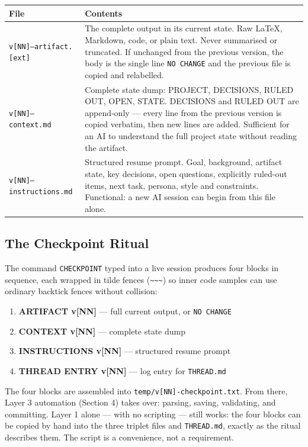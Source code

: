 \documentclass[12pt,letterpaper]{article}
\begin{document}
\begin{center}
\begin{tabular}{@{}lp{10cm}@{}}
\toprule
\textbf{File} & \textbf{Contents} \\
\midrule
\texttt{v[NN]--artifact.[ext]} &
The complete output in its current state. Raw LaTeX, Markdown,
code, or plain text. Never summarised or truncated. If unchanged
from the previous version, the body is the single line \texttt{NO CHANGE}
and the previous file is copied and relabelled. \\
\texttt{v[NN]--context.md} &
Complete state dump: PROJECT, DECISIONS, RULED OUT, OPEN, STATE.
DECISIONS and RULED OUT are append-only --- every line from the
previous version is copied verbatim, then new lines are added.
Sufficient for an AI to understand the full project state without
reading the artifact. \\
\texttt{v[NN]--instructions.md} &
Structured resume prompt. Goal, background, artifact state, key decisions,
open questions, explicitly ruled-out items, next task, persona, style and
constraints. Functional: a new AI session can begin from this file alone. \\
\bottomrule
\end{tabular}
\end{center}

\subsection{The Checkpoint Ritual}

The command \texttt{CHECKPOINT} typed into a live session produces four
blocks in sequence, each wrapped in tilde fences (\texttt{\~{}\~{}\~{}})
so inner code samples can use ordinary backtick fences without collision:

\begin{enumerate}
  \item \textbf{ARTIFACT v[NN]} --- full current output, or \texttt{NO CHANGE}
  \item \textbf{CONTEXT v[NN]} --- complete state dump
  \item \textbf{INSTRUCTIONS v[NN]} --- structured resume prompt
  \item \textbf{THREAD ENTRY v[NN]} --- log entry for \texttt{THREAD.md}
\end{enumerate}

The four blocks are assembled into \texttt{temp/v[NN]-checkpoint.txt}.
From there, Layer 3 automation (Section 4) takes over: parsing,
saving, validating, and committing. Layer 1 alone --- with no
scripting --- still works: the four blocks can be copied by hand into
the three triplet files and \texttt{THREAD.md}, exactly as the ritual
describes them. The script is a convenience, not a requirement.
\end{document}
